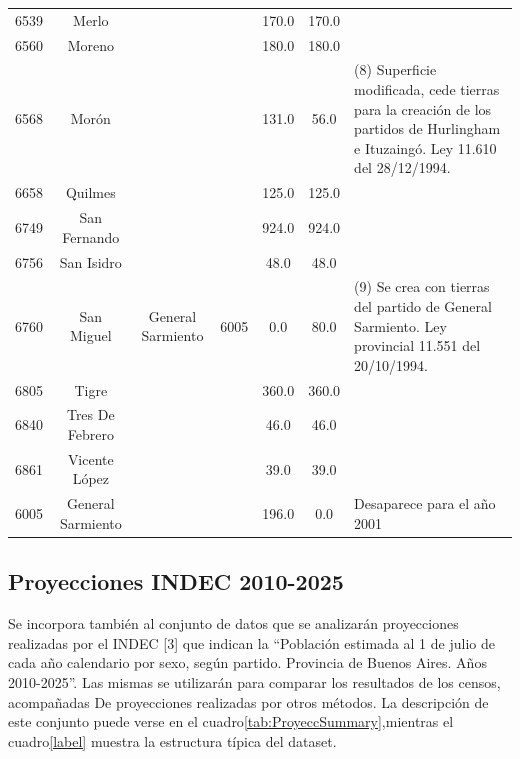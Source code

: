 \documentclass{article}
\theoremstyle{mytheoremstyle}
\theoremstyle{mytheoremstyle}
\theoremstyle{myproblemstyle}
\begin{document}
\begin{table}[htbp]
\begin{tabular}{|c|c|c|c|c|c|p{5cm}|}
        6539 & Merlo             && & 170.0             & 170.0 &   \\
        6560 & Moreno              &&& 180.0             & 180.0 & \\
        6568 & Morón                &&& 131.0             & 56.0  & (8) Superficie  modificada, cede tierras para la creación de los partidos de Hurlingham e Ituzaingó. Ley 11.610 del 28/12/1994.\\
        6658 & Quilmes            && & 125.0             & 125.0 &       \\
        6749 & San Fernando       && & 924.0             & 924.0 &    \\
        6756 & San Isidro         && & 48.0              & 48.0  &    \\
        6760 & San Miguel          & General Sarmiento & 6005  & 0.0 & 80.0 & (9) Se crea con tierras del partido de General Sarmiento. Ley provincial 11.551 del 20/10/1994. \\
        6805 & Tigre            &&   & 360.0             & 360.0 &     \\
        6840 & Tres De Febrero   &&  & 46.0              & 46.0  &      \\
        6861 & Vicente López     &&  & 39.0              & 39.0  &  \\
        6005 & General Sarmiento  && & 196.0             & 0.0   & Desaparece para el año 2001   \\        
     \hline
    \end{tabular}
    \label{tab:DimDepto}
\end{table}

\subsection{Proyecciones INDEC 2010-2025  }
Se incorpora también al conjunto de datos que se analizarán proyecciones realizadas por el INDEC [3] que indican la “Población estimada al 1 de julio de
 cada año calendario por sexo, según partido. Provincia de Buenos Aires. Años 2010-2025”. Las mismas se utilizarán para comparar los resultados de los censos, acompañadas De
 proyecciones realizadas por otros métodos. \newline
 La  descripción de este conjunto  puede verse en el  cuadro\ref{tab:ProyeccSummary},mientras el cuadro\ref*{label} muestra la estructura típica del 
 dataset.
\end{document}
